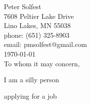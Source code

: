 \documentclass[letterpaper,12pt]{article}
\begin{document}
Peter Solfest\\
7608 Peltier Lake Drive\\
Lino Lakes, MN 55038\\
phone: (651) 325-8903\\
email: pmsolfest@gmail.com\\[8mm]

\today\\[8mm]


To whom it may concern, %

I am a silly person 

applying for a job
\end{document}
